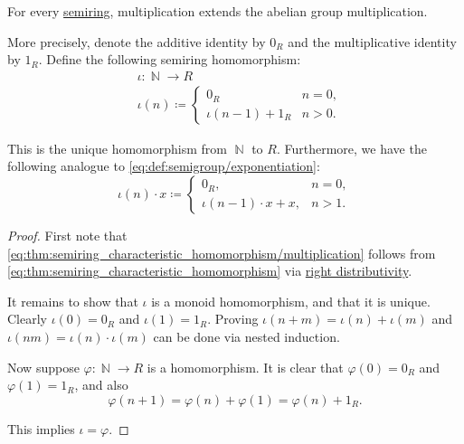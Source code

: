 \begin{proposition}\label{thm:semiring_characteristic_homomorphism}
  For every \hyperref[def:semiring]{semiring}, multiplication extends the abelian group multiplication.

  More precisely, denote the additive identity by \( 0_R \) and the multiplicative identity by \( 1_R \). Define the following semiring homomorphism:
  \begin{equation}\label{eq:thm:semiring_characteristic_homomorphism}
    \begin{aligned}
      &\iota: \BbbN \to R \\
      &\iota(n) \coloneqq \begin{cases}
        0_R                &n = 0, \\
        \iota(n - 1) + 1_R &n > 0.
      \end{cases}
    \end{aligned}
  \end{equation}

  This is the unique homomorphism from \( \BbbN \) to \( R \). Furthermore, we have the following analogue to \eqref{eq:def:semigroup/exponentiation}:
  \begin{equation}\label{eq:thm:semiring_characteristic_homomorphism/multiplication}
    \iota(n) \cdot x \coloneqq \begin{cases}
      0_R,                      &n = 0, \\
      \iota(n - 1) \cdot x + x, &n > 1.
    \end{cases}
  \end{equation}
\end{proposition}
\begin{proof}
  First note that \eqref{eq:thm:semiring_characteristic_homomorphism/multiplication} follows from \eqref{eq:thm:semiring_characteristic_homomorphism} via \hyperref[def:semiring/right_distributivity]{right distributivity}.

  It remains to show that \( \iota \) is a monoid homomorphism, and that it is unique. Clearly \( \iota(0) = 0_R \) and \( \iota(1) = 1_R \). Proving \( \iota(n + m) = \iota(n) + \iota(m) \) and \( \iota(nm) = \iota(n) \cdot \iota(m) \) can be done via nested induction.

  Now suppose \( \varphi: \BbbN \to R \) is a homomorphism. It is clear that \( \varphi(0) = 0_R \) and \( \varphi(1) = 1_R \), and also
  \begin{equation*}
    \varphi(n + 1) = \varphi(n) + \varphi(1) = \varphi(n) + 1_R.
  \end{equation*}

  This implies \( \iota = \varphi \).
\end{proof}


